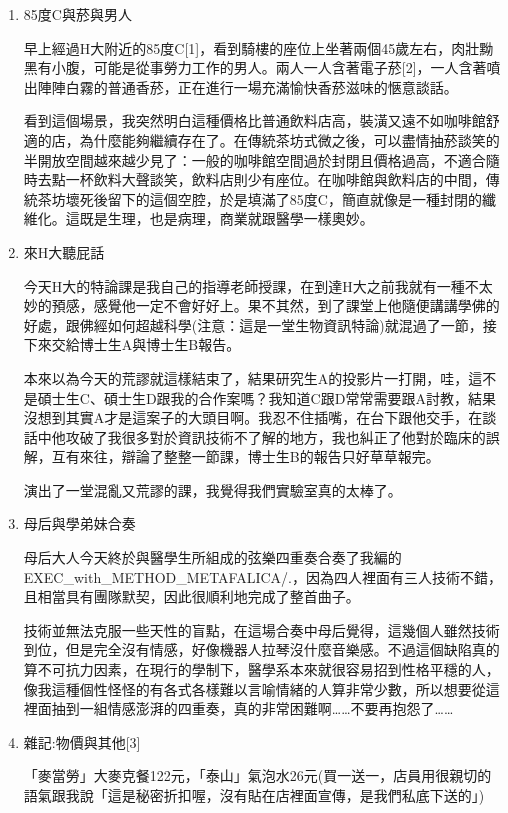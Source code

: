 \documentclass[a5paper, 12pt
]{book}
\begin{document}
\begin{enumerate}
\def\labelenumi{\arabic{enumi}.}
\item
  85度C與菸與男人

  早上經過H大附近的85度C{[}1{]}，看到騎樓的座位上坐著兩個45歲左右，肉壯黝黑有小腹，可能是從事勞力工作的男人。兩人一人含著電子菸{[}2{]}，一人含著噴出陣陣白霧的普通香菸，正在進行一場充滿愉快香菸滋味的愜意談話。

  看到這個場景，我突然明白這種價格比普通飲料店高，裝潢又遠不如咖啡館舒適的店，為什麼能夠繼續存在了。在傳統茶坊式微之後，可以盡情抽菸談笑的半開放空間越來越少見了：一般的咖啡館空間過於封閉且價格過高，不適合隨時去點一杯飲料大聲談笑，飲料店則少有座位。在咖啡館與飲料店的中間，傳統茶坊壞死後留下的這個空腔，於是填滿了85度C，簡直就像是一種封閉的纖維化。這既是生理，也是病理，商業就跟醫學一樣奧妙。
\item
  來H大聽屁話

  今天H大的特論課是我自己的指導老師授課，在到達H大之前我就有一種不太妙的預感，感覺他一定不會好好上。果不其然，到了課堂上他隨便講講學佛的好處，跟佛經如何超越科學(注意：這是一堂生物資訊特論)就混過了一節，接下來交給博士生A與博士生B報告。

  本來以為今天的荒謬就這樣結束了，結果研究生A的投影片一打開，哇，這不是碩士生C、碩士生D跟我的合作案嗎？我知道C跟D常常需要跟A討教，結果沒想到其實A才是這案子的大頭目啊。我忍不住插嘴，在台下跟他交手，在談話中他攻破了我很多對於資訊技術不了解的地方，我也糾正了他對於臨床的誤解，互有來往，辯論了整整一節課，博士生B的報告只好草草報完。

  演出了一堂混亂又荒謬的課，我覺得我們實驗室真的太棒了。
\item
  母后與學弟妹合奏

  母后大人今天終於與醫學生所組成的弦樂四重奏合奏了我編的EXEC\_with\_METHOD\_METAFALICA/.，因為四人裡面有三人技術不錯，且相當具有團隊默契，因此很順利地完成了整首曲子。

  技術並無法克服一些天性的盲點，在這場合奏中母后覺得，這幾個人雖然技術到位，但是完全沒有情感，好像機器人拉琴沒什麼音樂感。不過這個缺陷真的算不可抗力因素，在現行的學制下，醫學系本來就很容易招到性格平穩的人，像我這種個性怪怪的有各式各樣難以言喻情緒的人算非常少數，所以想要從這裡面抽到一組情感澎湃的四重奏，真的非常困難啊\ldots\ldots 不要再抱怨了\ldots\ldots{}
\item
  雜記:物價與其他{[}3{]}

  「麥當勞」大麥克餐122元，「泰山」氣泡水26元(買一送一，店員用很親切的語氣跟我說「這是秘密折扣喔，沒有貼在店裡面宣傳，是我們私底下送的」)
\end{enumerate}
\end{document}
